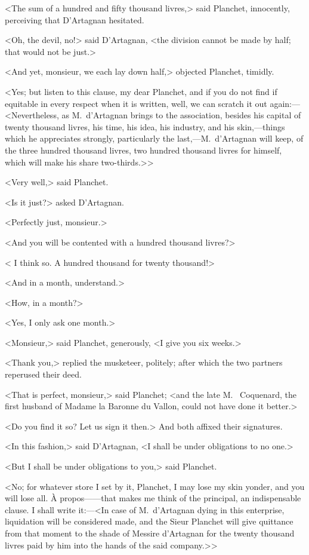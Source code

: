 <The sum of a hundred and fifty thousand livres,> said Planchet, innocently, perceiving that D'Artagnan hesitated.

<Oh, the devil, no!> said D'Artagnan, <the division cannot be made by half; that would not be just.>

<And yet, monsieur, we each lay down half,> objected Planchet, timidly.

<Yes; but listen to this clause, my dear Planchet, and if you do not find if equitable in every respect when it is written, well, we can scratch it out again:—<Nevertheless, as M.~d'Artagnan brings to the association, besides his capital of twenty thousand livres, his time, his idea, his industry, and his skin,—things which he appreciates strongly, particularly the last,—M.~d'Artagnan will keep, of the three hundred thousand livres, two hundred thousand livres for himself, which will make his share two-thirds.>>

<Very well,> said Planchet.

<Is it just?> asked D'Artagnan.

<Perfectly just, monsieur.>

<And you will be contented with a hundred thousand livres?>

< I think so. A hundred thousand for twenty thousand!>

<And in a month, understand.>

<How, in a month?>

<Yes, I only ask one month.>

<Monsieur,> said Planchet, generously, <I give you six weeks.>

<Thank you,> replied the musketeer, politely; after which the two partners reperused their deed.

<That is perfect, monsieur,> said Planchet; <and the late M.~ Coquenard, the first husband of Madame la Baronne du Vallon, could not have done it better.>

<Do you find it so? Let us sign it then.> And both affixed their signatures.

<In this fashion,> said D'Artagnan, <I shall be under obligations to no one.>

<But I shall be under obligations to you,> said Planchet.

<No; for whatever store I set by it, Planchet, I may lose my skin yonder, and you will lose all. À propos——that makes me think of the principal, an indispensable clause. I shall write it:—<In case of M.~d'Artagnan dying in this enterprise, liquidation will be considered made, and the Sieur Planchet will give quittance from that moment to the shade of Messire d'Artagnan for the twenty thousand livres paid by him into the hands of the said company.>>

